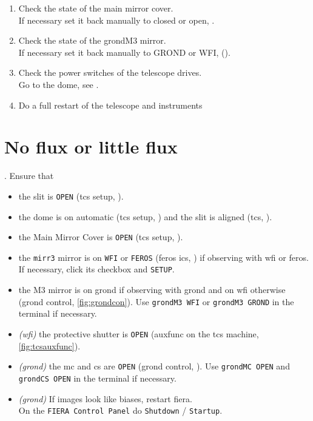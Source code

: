 \documentclass[11pt,fleqn,a4paper]{book}
\begin{document}
\begin{enumerate}
    \item Check the state of the \gls{main mirror} cover.\\
          If necessary set it back manually to closed or open, .
    \item Check the state of the \gls{grondM3} mirror.\\
          If necessary set it back manually to GROND or WFI,  ().
    \item Check the power switches of the telescope drives.\\
          Go to the dome, see .
    \item Do a full restart of the telescope and instruments
\end{enumerate}

\section{No flux or little flux}
\label{sec:noflux}

. Ensure that
\begin{itemize}
  \item the \gls{slit} is \texttt{OPEN} (\gls{tcs} setup, ).
  \item the dome is on automatic (\gls{tcs} setup,
        ) and the slit is aligned (\gls{tcs}, ).
  \item the Main Mirror Cover is \texttt{OPEN} (\gls{tcs} setup,
        ).
  \item the \texttt{\gls{mirr3}} mirror is on \texttt{WFI} or \texttt{FEROS} (\gls{feros} \gls{ics}, 
        ) if observing with \gls{wfi} or \gls{feros}.  If necessary,
        click its checkbox and \texttt{SETUP}.
  \item the \gls{M3} mirror is on \gls{grond} if observing with \gls{grond} and on \gls{wfi} otherwise
         (\gls{grond} control, \ref{fig:grondcon}).  Use 
        \texttt{\gls{grondM3} WFI} or \texttt{\gls{grondM3} GROND} in the terminal if
        necessary.
  \item \textit{(\gls{wfi})} the \gls{protective shutter} is \texttt{OPEN} (\gls{auxfunc} 
        on the \gls{tcs} machine, \ref{fig:tcsauxfunc}). 
  \item \textit{(\gls{grond})} the \gls{mc} and \gls{cs} are \texttt{OPEN} (\gls{grond} control,
        ).  Use \texttt{\gls{grondMC} OPEN} and \texttt{\gls{grondCS} OPEN} in the terminal if necessary.
  \item \textit{(\gls{grond})} If images look like biases, restart \gls{fiera}.\\
  On the \texttt{FIERA Control Panel} do \texttt{Shutdown} / \texttt{Startup}.
\end{itemize}
\end{document}
